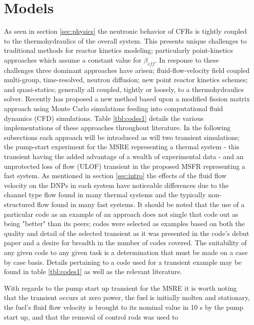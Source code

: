 \documentclass[review]{elsarticle}
\begin{document}
\section{Models} \label{sec:models}
As seen in section \ref{sec:physics} the neutronic behavior of CFRs is tightly
coupled to the thermohydraulics of the overall system. This presents unique
challenges to traditional methods for reactor kinetics modeling; particularly
point-kinetics approaches which assume a constant value for $\beta_{eff}$. In
response to these challenges three dominant approaches have arisen; 
fluid-flow-velocity field coupled multi-group, time-resolved, neutron diffusion;
new point reactor kinetics schemes; and quasi-statics; generally all coupled, tightly
or loosely, to a thermohydraulics solver. Recently
\cite{laureau_coupled_2015} has proposed a new method based upon a modified
fission matrix approach using Monte Carlo simulations feeding into
computational fluid dynamics (CFD) simulations. Table \ref{tbl:codes1} details
the various implementations of these approaches throughout literature.
In the following subsections
each approach will be introduced as will two transient simulations; the pump-start
experiment for the MSRE representing a thermal system - this transient having
the added advantage of a wealth of experimental data - and an unprotected loss
of flow (ULOF) transient in the proposed MSFR representing a fast system.
As mentioned in
section \ref{sec:intro} the effects of the fluid flow velocity on the DNPs in each
system have noticeable differences due to the channel type flow found in many
thermal systems and the typically non-structured flow found in many fast
systems.
It should be noted that the use of a particular code as an example of an
approach does not single that code out as being "better" than its peers; codes
were selected as examples based on both the quality and detail of the selected
transient as it was presented in the code's debut paper and a desire for breadth in the number of codes covered. The suitability of any given code to any given task
is a determination that must be made on a case by case basis. Details pertaining
to a code used for a transient example may be found in table \ref{tbl:codes1} as
well as the relevant literature.
\par With regards to the pump start up transient for the MSRE it is worth noting
that the transient occurs at zero power, the fuel is initially molten and
stationary, the fuel's fluid flow velocity is brought to its nominal value in
10 s by the pump start up, and that the removal of control rods was used to
\end{document}
